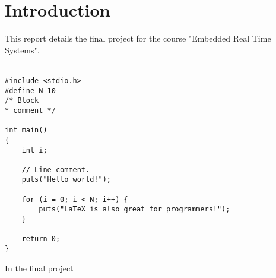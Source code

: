 \section{Introduction}

This report details the final project for the course "Embedded Real Time Systems".  \\\\
\begin{lstlisting}[style=customc++, caption=Example listing.]
#include <stdio.h>
#define N 10
/* Block
* comment */

int main()
{
	int i;

	// Line comment.
	puts("Hello world!");

	for (i = 0; i < N; i++) {
		puts("LaTeX is also great for programmers!");
	}

	return 0;
}
\end{lstlisting}

In the final project 